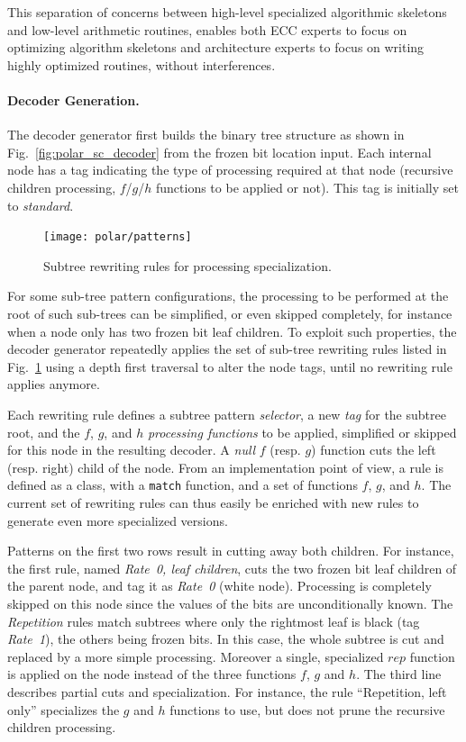 This separation of concerns between high-level specialized algorithmic skeletons
and low-level arithmetic routines, enables both ECC experts to focus on
optimizing algorithm skeletons and architecture experts to focus on writing
highly optimized routines, without interferences.

\paragraph{Decoder Generation.}

The decoder generator first builds the binary tree structure as shown in
Fig.~\ref{fig:polar_sc_decoder} from the frozen bit location input. Each
internal node has a tag indicating the type of processing required at that node
(recursive children processing, $f$/$g$/$h$ functions to be applied or not).
This tag is initially set to \emph{standard}.

\begin{figure}
  \centering
  \texttt{[image: polar/patterns]}
  \caption{Subtree rewriting rules for processing specialization.}
  \label{fig:polar_patterns}
\end{figure}

For some sub-tree pattern configurations, the processing to be performed at the
root of such sub-trees can be simplified, or even skipped completely, for
instance when a node only has two frozen bit leaf children. To exploit such
properties, the decoder generator repeatedly applies the set of sub-tree
rewriting rules listed in Fig.~\ref{fig:polar_patterns} using a depth first
traversal to alter the node tags, until no rewriting rule applies anymore.

Each rewriting rule defines a subtree pattern \emph{selector}, a new \emph{tag}
for the subtree root, and the $f$, $g$, and $h$ \emph{processing functions} to
be applied, simplified or skipped for this node in the resulting decoder. A
\emph{null} $f$ (resp. $g$) function cuts the left (resp. right) child of the
node. From an implementation point of view, a rule is defined as a class, with a
\verb|match| function, and a set of functions $f$, $g$, and $h$. The current
set of rewriting rules can thus easily be enriched with new rules to generate
even more specialized versions.

Patterns on the first two rows result in cutting away both children. For
instance, the first rule, named \emph{Rate~0, leaf children}, cuts the two
frozen bit leaf children of the parent node, and tag it as \emph{Rate~0} (white
node). Processing is completely skipped on this node since the values of the
bits are unconditionally known. The \emph{Repetition} rules match subtrees where
only the rightmost leaf is black (tag \emph{Rate~1}), the others being frozen
bits. In this case, the whole subtree is cut and replaced by a more simple
processing. Moreover a single, specialized $rep$ function is applied on the node
instead of the three functions $f$, $g$ and $h$. The third line describes
partial cuts and specialization. For instance, the rule ``Repetition, left
only'' specializes the $g$ and $h$ functions to use, but does not prune the
recursive children processing.

